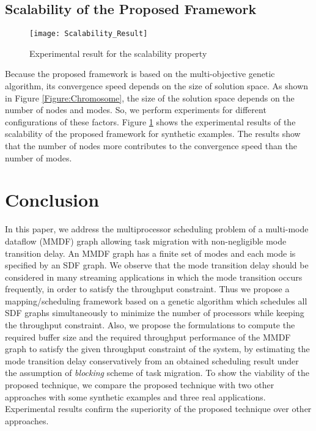 \documentclass[prodmode,acmtecs]{acmsmall}
\begin{document}
\subsection{Scalability of the Proposed Framework}
\label{Scalability of the Proposed Framework}

\begin{figure} [ht]
\centerline{\texttt{[image: Scalability\_Result]}}
\caption{Experimental result for the scalability property}
\label{Figure:Scalability Result}
\end{figure}

Because the proposed framework is based on the multi-objective genetic algorithm, its convergence speed depends on the size of solution space. As shown in Figure \ref{Figure:Chromosome}, the size of the solution space depends on the number of nodes and modes. So, we perform experiments for different configurations of these factors. Figure \ref{Figure:Scalability Result} shows the experimental results of the scalability of the proposed framework for synthetic examples. The results show that the number of nodes more contributes to the convergence speed than the number of modes.

\section{Conclusion}
\label{Section:Conclusion}

In this paper, we address the multiprocessor scheduling problem of a multi-mode dataflow (MMDF) graph allowing task migration with non-negligible mode transition delay. An MMDF graph has a finite set of modes and each mode is specified by an SDF graph. We observe that the mode transition delay should be considered in many streaming applications in which the mode transition occurs frequently, in order to satisfy the throughput constraint. Thus we propose a mapping/scheduling framework based on a genetic algorithm which schedules all SDF graphs simultaneously to minimize the number of processors while keeping the throughput constraint. Also, we propose the formulations to compute the required buffer size and the required throughput performance of the MMDF graph to satisfy the given throughput constraint of the system, by estimating the mode transition delay conservatively from an obtained scheduling result under the assumption of \textit{blocking} scheme of task migration.
To show the viability of the proposed technique, we compare the proposed technique with two other approaches with some synthetic examples and three real applications. Experimental results confirm the superiority of the proposed technique over other approaches.
\end{document}
